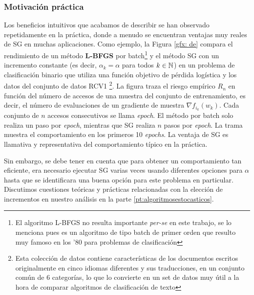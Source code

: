 \subsubsection{Motivación práctica}

Los beneficios intuitivos que acabamos de describir se han observado repetidamente en la práctica, donde a menudo se encuentran ventajas muy reales de SG en muchas aplicaciones. Como ejemplo, la Figura \ref{gfx: de} compara el rendimiento de un método \textbf{L-BFGS} por batch\footnote[1]{El algoritmo L-BFGS no resulta importante \textit{per-se} en este trabajo, se lo menciona pues es un algoritmo de tipo batch de primer orden que resulto muy famoso en los '80 para problemas de clasificaci\'on} \cite{liu:1989} \cite{nocedal:1980} y el método SG con un incremento constante (es decir, $\alpha_k = \alpha$ para todos $k \in {\mathbb{N}}$) en un problema de clasificación binario que utiliza una función objetivo de pérdida logística y los datos del conjunto de datos RCV1 \footnote[2]{Esta colecci\'on de datos contiene caracter\'isticas de los documentos escritos originalmente en cinco idiomas diferentes y sus traducciones, en un conjunto com\'un de 6 categor\'ias, lo que lo convierte en un set de datos muy \'util a la hora de comparar algoritmos de clasificaci\'on de texto}. La figura traza el riesgo empírico $R_n$ en función del número de accesos de una muestra del conjunto de entrenamiento, es decir, el número de evaluaciones de un gradiente de muestra $\nabla f_{i_k}(w_k)$. Cada conjunto de $n$ accesos consecutivos se llama \textit{epoch}. El método por batch solo realiza un paso por \textit{epoch}, mientras que SG realiza $n$ pasos por \textit{epoch}. La trama muestra el comportamiento en los primeros 10 \textit{epochs}. La ventaja de SG es llamativa y representativa del comportamiento típico en la práctica. 

Sin embargo, se debe tener en cuenta que para obtener un comportamiento tan eficiente, era necesario ejecutar SG varias veces usando diferentes opciones para $\alpha$ hasta que se identificara una buena opción para este problema en particular. Discutimos cuestiones teóricas y prácticas relacionadas con la elección de incrementos en nuestro análisis en la parte \ref{pt:algoritmosestocasticos}.


